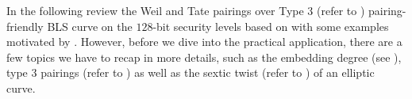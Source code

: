 In the following  review the Weil and Tate pairings over Type 3 (refer to ) pairing-friendly BLS curve on the $128$-bit security levels based on \cite{Aranha2011,ecc.pairings.param,BLS03, ecc.pairing.curves.bls,wb19, Costello2012} with some examples motivated by \cite{theory.pairings.for.beginners, Costello2012, gitlabpairings192}. However, before we dive into  the practical application, there are a few topics we have to recap in more details, such as the embedding degree (see  ), type 3 pairings (refer to ) as well as the sextic twist (refer to ) of an elliptic curve. 



